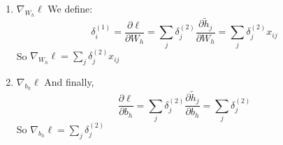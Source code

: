 \documentclass[12pt,a4paper]{article}
\begin{document}
\begin{enumerate}[resume]
\begin{enumerate}
        \item $\nabla_{W_h}\ell$ \newline 
        We define:
        \[
        \delta_i^{(1)} = \frac{\partial \ell}{\partial W_h} = \sum_j \delta_j^{(2)} \frac{\partial \tilde{h}_j}{\partial W_h} =
        \sum_j \delta_j^{(2)} x_{ij}
        \]
        So $\nabla_{W_h}\ell = \sum_j \delta_j^{(2)} x_{ij}$
        
        \item $\nabla_{b_h}\ell$ \newline
        And finally,
        \[
        \frac{\partial \ell}{\partial b_h} = \sum_j \delta_j^{(2)} \frac{\partial \tilde{h}_j}{\partial b_h} = 
        \sum_j \delta_j^{(2)}
        \]
        So $\nabla_{b_h}\ell = \sum_j \delta_j^{(2)} $        
    \end{enumerate}

\end{enumerate}
\end{document}
